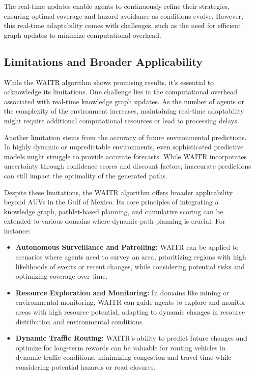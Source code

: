 \documentclass[conference]{IEEEtran}
\begin{document}
The real-time updates enable agents to continuously refine their strategies, ensuring optimal coverage and hazard avoidance as conditions evolve. However, this real-time adaptability comes with challenges, such as the need for efficient graph updates to minimize computational overhead.

\subsection{Limitations and Broader Applicability}

While the WAITR algorithm shows promising results, it's essential to acknowledge its limitations. One challenge lies in the computational overhead associated with real-time knowledge graph updates. As the number of agents or the complexity of the environment increases, maintaining real-time adaptability might require additional computational resources or lead to processing delays.

Another limitation stems from the accuracy of future environmental predictions. In highly dynamic or unpredictable environments, even sophisticated predictive models might struggle to provide accurate forecasts. While WAITR incorporates uncertainty through confidence scores and discount factors, inaccurate predictions can still impact the optimality of the generated paths.

Despite these limitations, the WAITR algorithm offers broader applicability beyond AUVs in the Gulf of Mexico. Its core principles of integrating a knowledge graph, pathlet-based planning, and cumulative scoring can be extended to various domains where dynamic path planning is crucial. For instance:

\begin{itemize}
    \item \textbf{Autonomous Surveillance and Patrolling:} WAITR can be applied to scenarios where agents need to survey an area, prioritizing regions with high likelihoods of events or recent changes, while considering potential risks and optimizing coverage over time.
    \item \textbf{Resource Exploration and Monitoring:} In domains like mining or environmental monitoring, WAITR can guide agents to explore and monitor areas with high resource potential, adapting to dynamic changes in resource distribution and environmental conditions.
    \item \textbf{Dynamic Traffic Routing:} WAITR's ability to predict future changes and optimize for long-term rewards can be valuable for routing vehicles in dynamic traffic conditions, minimizing congestion and travel time while considering potential hazards or road closures.
\end{itemize}
\end{document}
